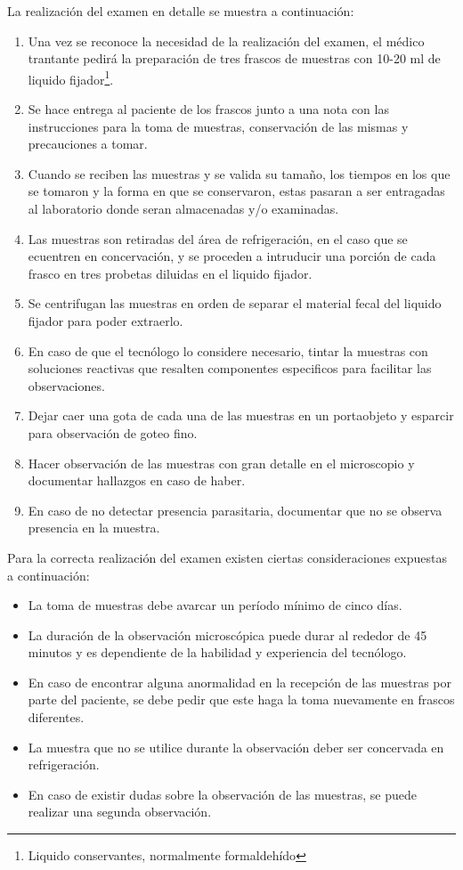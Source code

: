 \documentclass[letter,12pt]{report}
\begin{document}
La realización del examen en detalle se muestra a continuación:\cite{Serial, Serial2}
\begin{enumerate}
    \item Una vez se reconoce la necesidad de la realización del examen, el médico
        trantante pedirá la preparación de tres frascos de muestras con 10-20 ml de
        liquido fijador\footnote{Liquido conservantes, normalmente formaldehído}.
    \item Se hace entrega al paciente de los frascos junto a una nota con las
        instrucciones para la toma de muestras, conservación de las mismas y precauciones
        a tomar.
    \item Cuando se reciben las muestras y se valida su tamaño, los tiempos en los que se
        tomaron y la forma en que se conservaron, estas pasaran a ser entragadas al
        laboratorio donde seran almacenadas y/o examinadas.
    \item Las muestras son retiradas del área de refrigeración, en el caso que se
        ecuentren en concervación, y se proceden a intruducir una porción de cada frasco
        en tres probetas diluidas en el liquido fijador.
    \item Se centrifugan las muestras en orden de separar el material fecal del liquido
        fijador para poder extraerlo.
    \item En caso de que el tecnólogo lo considere necesario, tintar la muestras con
        soluciones reactivas que resalten componentes especificos para facilitar las
        observaciones.
    \item Dejar caer una gota de cada una de las muestras en un portaobjeto y esparcir
        para observación de goteo fino.
    \item Hacer observación de las muestras con gran detalle en el microscopio y
        documentar hallazgos en caso de haber.
    \item En caso de no detectar presencia parasitaria, documentar que no se observa
        presencia en la muestra.
\end{enumerate}

Para la correcta realización del examen existen ciertas consideraciones expuestas a
continuación:
\begin{itemize}
    \item La toma de muestras debe avarcar un período mínimo de cinco días.
    \item La duración de la observación microscópica puede durar al rededor de 45
        minutos y es dependiente de la habilidad y experiencia del tecnólogo.
    \item En caso de encontrar alguna anormalidad en la recepción de las muestras por
        parte del paciente, se debe pedir que este haga la toma nuevamente en frascos
        diferentes.
    \item La muestra que no se utilice durante la observación deber ser concervada en
        refrigeración.
    \item En caso de existir dudas sobre la observación de las muestras, se puede
        realizar una segunda observación.
\end{itemize}
\end{document}
